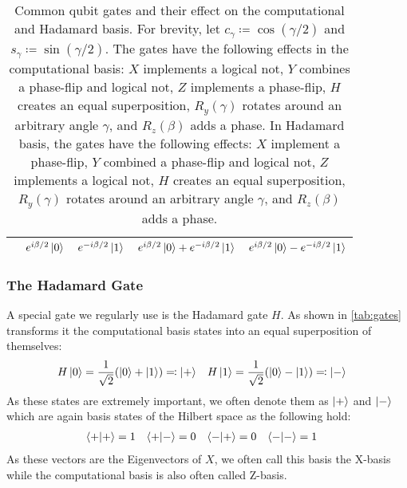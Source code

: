 \begin{table}
\begin{tabular}{l|ll|ll}
					& \( e^{ i \beta / 2} \ket{0} \)
					& \( e^{-i \beta / 2} \ket{1} \)
					& \( e^{ i \beta / 2} \ket{0} + e^{-i \beta / 2} \ket{1} \)
					& \( e^{ i \beta / 2} \ket{0} - e^{-i \beta / 2} \ket{1} \)
					\\
					\bottomrule
				\end{tabular}
				\caption[Common Single-Qubit Gates]{Common qubit gates and their effect on the computational and Hadamard basis. For brevity, let \( c_\gamma \coloneqq \cos(\gamma / 2) \) and \( s_\gamma \coloneqq \sin(\gamma / 2) \). The gates have the following effects in the computational basis: \(X\) implements a logical not, \(Y\) combines a phase-flip and logical not, \(Z\) implements a phase-flip, \(H\) creates an equal superposition, \(R_y(\gamma)\) rotates around an arbitrary angle \(\gamma\), and \(R_z(\beta)\) adds a phase. In Hadamard basis, the gates have the following effects: \(X\) implement a phase-flip, \(Y\) combined a phase-flip and logical not, \(Z\) implements a logical not, \(H\) creates an equal superposition, \(R_y(\gamma)\) rotates around an arbitrary angle \(\gamma\), and \(R_z(\beta)\) adds a phase.}
				\label{tab:gates}
			\end{table}

			\subsubsection{The Hadamard Gate}
				\label{subsec:hadamardGate}

				A special gate we regularly use is the Hadamard gate \(H\). As shown in \autoref{tab:gates} transforms it the computational basis states into an equal superposition of themselves:
				\begin{align}
					H \ket{0} & = \frac{1}{\sqrt{2}} (\ket{0} + \ket{1}) \eqqcolon \ket{+} &
					H \ket{1} & = \frac{1}{\sqrt{2}} (\ket{0} - \ket{1}) \eqqcolon \ket{-}
					\label{eq:hadamardBasis}
				\end{align}
				As these states are extremely important, we often denote them as \(\ket{+}\) and \(\ket{-}\) which are again basis states of the Hilbert space as the following hold:
				\begin{align}
					\ip{+}{+} & = 1 &
					\ip{+}{-} & = 0 &
					\ip{-}{+} & = 0 &
					\ip{-}{-} & = 1
				\end{align}
				As these vectors are the Eigenvectors of \(X\), we often call this basis the X-basis while the computational basis is also often called Z-basis.

